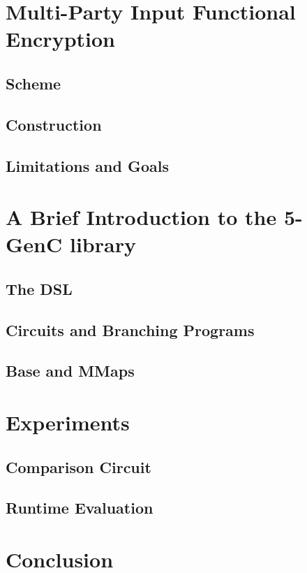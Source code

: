 \documentclass[12pt,twoside]{reedthesis}
\begin{document}
    
    
    
    \chapter{Multi-Party Input Functional Encryption}
    \section{Scheme}
    \section{Construction}
    \section{Limitations and Goals}
    
    
    
    \chapter{ A Brief Introduction to the 5-GenC library}
    \section{ The DSL}
    \section{Circuits and Branching Programs}
    \section{Base and MMaps}
    
    \chapter{Experiments}
    \section{Comparison Circuit}
    \section{Runtime Evaluation}
    
    
    \chapter{Conclusion} 
    
    
    
    

 

\end{document}
